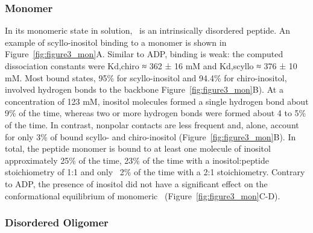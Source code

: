 \subsubsection{Monomer}

In its monomeric state in solution, \gafour\ is an intrinsically disordered peptide.\cite{Nikolic:2011p57} An example of scyllo-inositol binding to a monomer is shown in Figure~\ref{fig:figure3_mon}A. Similar to ADP, binding is weak: the computed dissociation constants were Kd,chiro ≈ 362 ± 16 mM and Kd,scyllo ≈ 376 ± 10 mM. Most bound states, 95\% for scyllo-inositol and 94.4\% for chiro-inositol, involved hydrogen bonds to the backbone Figure~\ref{fig:figure3_mon}B). At a concentration of 123 mM, inositol molecules formed a single hydrogen bond about 9\% of the time, whereas two or more hydrogen bonds were formed about 4 to 5\% of the time. In contrast, nonpolar contacts are less frequent and, alone, account for only 3\% of bound scyllo- and chiro-inositol (Figure~\ref{fig:figure3_mon}B). In total, the peptide monomer is bound to at least one molecule of inositol approximately 25\% of the time, 23\% of the time with a inositol:peptide stoichiometry of 1:1 and only ~2\% of the time with a 2:1 stoichiometry. Contrary to ADP, the presence of inositol did not have a significant effect on the conformational equilibrium of monomeric \gafour\ (Figure~\ref{fig:figure3_mon}C-D).

\subsubsection{Disordered Oligomer}

